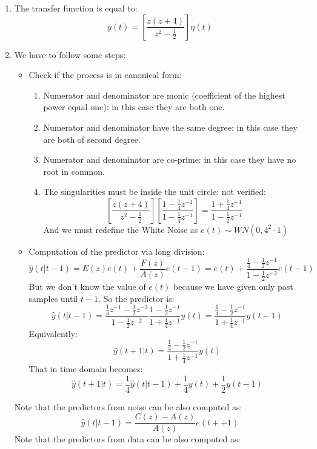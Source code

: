\begin{enumerate}
    \item The transfer function is equal to: 
        \[y(t)=\left[\dfrac{z(z+4)}{z^2-\frac{1}{2}}\right]\eta(t)\]
    \item We have to follow some steps: 
        \begin{itemize}
            \item Check if the process is in canonical form: 
                \begin{enumerate}
                    \item Numerator and denominator are monic (coefficient of the highest power equal one): in this case they are both one. 
                    \item Numerator and denominator have the same degree: in this case they are both of second degree. 
                    \item Numerator and denominator are co-prime: in this case they have no root in common. 
                    \item The singularities must be inside the unit circle: not verified: 
                        \[\left[\dfrac{z(z+4)}{z^2-\frac{1}{2}}\right]\left[\dfrac{1-\frac{1}{4}z^{-1}}{1-\frac{1}{4}z^{-1}}\right]=\dfrac{1+\frac{1}{4}z^{-1}}{1-\frac{1}{2}z^{-1}}\]
                        And we must redefine the White Noise as $e(t)\sim WN(0,4^2\cdot 1)$
                \end{enumerate}
            \item Computation of the predictor via long division: 
                \[\hat{y}(t|t-1)=E(z)e(t)+\dfrac{F(z)}{A(z)}e(t-1)=e(t)+\dfrac{\frac{1}{4}-\frac{1}{2}z^{-1}}{1-\frac{1}{2}z^{-2}}e(t-1)\]
                But we don't know the value of $e(t)$ because we have given only past samples until $t-1$.
                So the predictor is: 
                \[\hat{y}(t|t-1)=\dfrac{\frac{1}{4}z^{-1}-\frac{1}{2}z^{-2}}{1-\frac{1}{2}z^{-2}}\dfrac{1-\frac{1}{2}z^{-1}}{1+\frac{1}{4}z^{-1}}y(t)=\dfrac{\frac{1}{4}-\frac{1}{2}z^{-1}}{1+\frac{1}{4}z^{-1}}y(t-1)\]
                Equivalently: 
                \[\hat{y}(t+1|t)=\dfrac{\frac{1}{4}-\frac{1}{2}z^{-1}}{1+\frac{1}{4}z^{-1}}y(t)\]
                That in time domain becomes: 
                \[\hat{y}(t+1|t)=\dfrac{1}{4}\hat{y}(t|t-1)+\dfrac{1}{4}y(t)+\dfrac{1}{2}y(t-1)\]
        \end{itemize}
        Note that the predictors from noise can be also computed as: 
        \[\hat{y}(t|t-1)=\dfrac{C(z)-A(z)}{A(z)}e(t++1)\]
        Note that the predictors from data can be also computed as: 

\end{enumerate}
